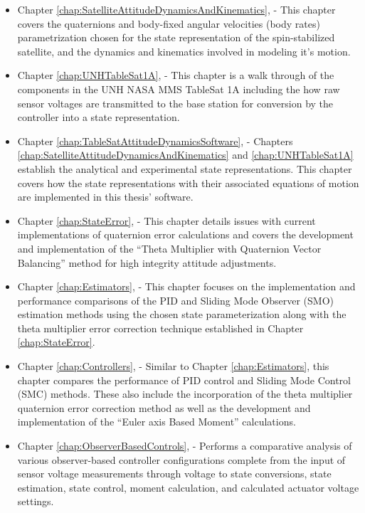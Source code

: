 \begin{itemize}
\item Chapter \ref{chap:SatelliteAttitudeDynamicsAndKinematics},  - This chapter covers the quaternions and body-fixed angular velocities (body rates) parametrization chosen for the state representation of the spin-stabilized satellite, and the dynamics and kinematics involved in modeling it's motion.
\item Chapter \ref{chap:UNHTableSat1A},  - This chapter is a walk through of the components in the UNH NASA MMS TableSat 1A including the how raw sensor voltages are transmitted to the base station for conversion by the controller into a state representation.
\item Chapter \ref{chap:TableSatAttitudeDynamicsSoftware},  - Chapters \ref{chap:SatelliteAttitudeDynamicsAndKinematics} and \ref{chap:UNHTableSat1A} establish the analytical and experimental state representations.  This chapter covers how the state representations with their associated equations of motion are implemented in this thesis' software.
\item Chapter \ref{chap:StateError},  - This chapter details issues with current implementations of quaternion error calculations and covers the development and implementation of the ``Theta Multiplier with Quaternion Vector Balancing'' method for high integrity attitude adjustments.
\item Chapter \ref{chap:Estimators},  - This chapter focuses on the implementation and performance comparisons of the PID and Sliding Mode Observer (SMO) estimation methods using the chosen state parameterization along with the theta multiplier error correction technique established in Chapter \ref{chap:StateError}.
\item Chapter \ref{chap:Controllers},  - Similar to Chapter \ref{chap:Estimators}, this chapter compares the performance of PID control and Sliding Mode Control (SMC) methods.  These also include the incorporation of the theta multiplier quaternion error correction method as well as the development and implementation of the ``Euler axis Based Moment'' calculations.
\item Chapter \ref{chap:ObserverBasedControls},  - Performs a comparative analysis of various observer-based controller configurations complete from the input of sensor voltage measurements through voltage to state conversions, state estimation, state control, moment calculation, and calculated actuator voltage settings.

\end{itemize}
